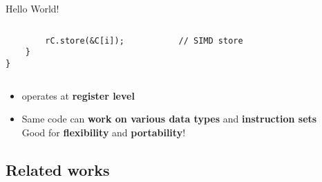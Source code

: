 \begin{frame}[fragile]{Hello World!}
\begin{columns}[t]
\begin{column}[T]{8.6cm}
\begin{overprint}
\begin{verbatim}
		rC.store(&C[i]);           // SIMD store
	}
}
      \end{verbatim}
      \end{overprint}
    \end{column}
  \end{columns}
  \pause
  \begin{itemize}
    \item \MIPP operates at \textbf{register level}
    \pause
    \item Same code can \textbf{work on various data types} and \textbf{instruction sets}
    \pause
    	\\\vspace*{.5em}
      {\color{bleuUni}\Large\MVRightarrow} Good for \textbf{flexibility} and \textbf{portability}!
  \end{itemize}
\end{frame}

\subsection[Related works]{Related works}

